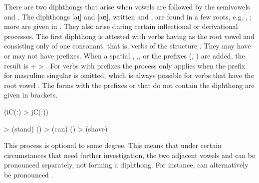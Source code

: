 There are two diphthongs that arise when vowels are followed by the semivowels  and . The diphthongs [aɪ̯] and [aʊ̯], written  and , are found in a few roots, e.g.  ,  ; more are given in . They also arise during certain inflectional or derivational processes. The first diphthong is attested with verbs having  as the root vowel and consisting only of one consonant, that is, verbs of the structure . They may have or may not have  prefixes. When a spatial  , ,, or the  prefixes (, ) are added, the result is  +  > . For verbs with  prefixes the process only applies when the  prefix  for masculine singular is omitted, which is always possible for verbs that have the root vowel . The forms with the  prefixes  or  that do not contain the diphthong are given in brackets.
%
\begin{exe}
	 (iC(ː) > jC(ː))\label{ex:a i aj phon}
	\begin{xlist}
		\ex	{} >   (stand) ()
		\ex	{} >   (can) ()
		\ex	{} >   (shave)
	\end{xlist}
\end{exe}

This process is optional to some degree. This means that under certain circumstances that need further investigation, the two adjacent vowels  and  can be pronounced separately, not forming a diphthong. For instance,  can alternatively be pronounced  .

